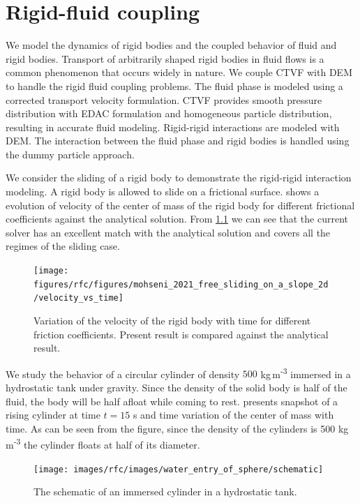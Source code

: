 \chapter{Rigid-fluid coupling}
\label{chap:rfc}
We model the dynamics of rigid bodies and the coupled behavior of fluid and
rigid bodies. Transport of arbitrarily shaped rigid bodies in fluid flows is a
common phenomenon that occurs widely in nature. We couple CTVF with DEM to
handle the rigid fluid coupling problems. The fluid phase is modeled using a
corrected transport velocity formulation. CTVF provides smooth pressure
distribution with EDAC formulation and homogeneous particle distribution,
resulting in accurate fluid modeling. Rigid-rigid interactions are modeled with
DEM. The interaction between the fluid phase and rigid bodies is handled using
the dummy particle approach.

We consider the sliding of a rigid body to demonstrate the rigid-rigid interaction
modeling. A rigid body is allowed to slide on a frictional surface.
 shows a evolution of
velocity of the center of mass of the rigid body for different frictional
coefficients against the analytical solution. From
\cref{fig:results-solid-sliding-velocity-vs-time-2d} we can see that the current
solver has an excellent match with the analytical solution and covers all the
regimes of the sliding case.
\begin{figure}[tpb]
  \centering
  \texttt{[image: figures/rfc/figures/mohseni\_2021\_free\_sliding\_on\_a\_slope\_2d/velocity\_vs\_time]}
  \caption{Variation of the velocity of the rigid body with time for different
    friction coefficients. Present result is compared against the analytical
    result.}
\label{fig:results-solid-sliding-velocity-vs-time-2d}
\end{figure}


We study the behavior of a circular cylinder of density $500$
kg\,m\textsuperscript{-3} immersed in a hydrostatic tank under gravity. Since
the density of the solid body is half of the fluid, the body will be half afloat
while coming to rest.  presents
snapshot of a rising cylinder at time $t=15$ s and time variation of the center
of mass with time. As can be seen from the figure, since the density of the
cylinders is 500 kg\,m\textsuperscript{-3} the cylinder floats at half of its
diameter.
\begin{figure}[tpb]
  \centering
    \texttt{[image: images/rfc/images/water\_entry\_of\_sphere/schematic]}
  \caption{The schematic of an immersed cylinder in a hydrostatic tank.}
\label{fig:raising-falling-solid-in-water}
\end{figure}

